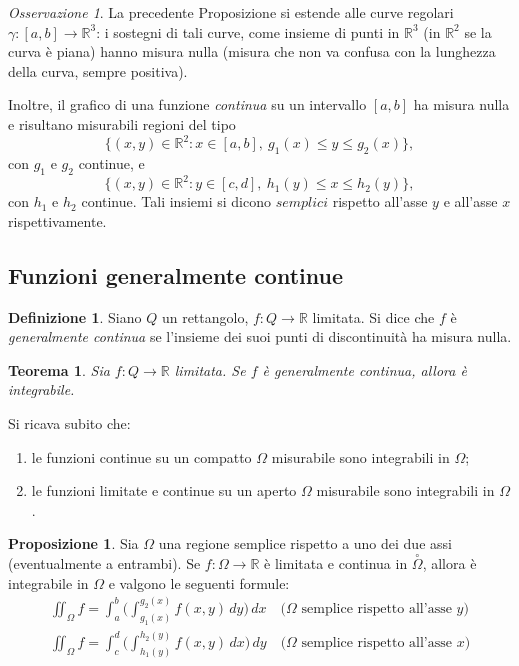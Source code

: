 \documentclass[a4paper]{book}
\numberwithin{equation}{section}
\theoremstyle{plain}
\newtheorem{teor}{Teorema}[section]
\theoremstyle{definition}
\newtheorem{defn}{Definizione}[section]
\newtheorem{prop}{Proposizione}[section]
\theoremstyle{remark}
\newtheorem{oss}{Osservazione}[section]
\theoremstyle{example}
\begin{document}
\begin{oss}
	La precedente Proposizione si estende alle curve regolari $\gamma \colon [a, b] \to \mathbb{R}^3$: i sostegni di tali curve, come insieme di punti in $\mathbb{R}^3$ (in $\mathbb{R}^2$ se la curva è piana) hanno misura nulla (misura che non va confusa con la lunghezza della curva, sempre positiva).
\end{oss}

Inoltre, il grafico di una funzione \emph{continua} su un intervallo $[a, b]$ ha misura nulla e risultano misurabili regioni del tipo
\begin{equation}
	\{(x,y) \in \mathbb{R}^2  \colon x \in [a, b], \ g_1 (x) \le y \le g_2(x)\},
\end{equation}
con $g_1$ e $g_2$ continue, e
\begin{equation}
	\{(x,y) \in \mathbb{R}^2 \colon y \in [c,d], \ h_1(y) \le x \le h_2(y) \},
\end{equation}
con $h_1$ e $h_2$ continue. Tali insiemi si dicono $semplici$ rispetto all'asse $y$ e all'asse $x$ rispettivamente.

\subsection{Funzioni generalmente continue}
\begin{defn}
	Siano $Q$ un rettangolo, $f \colon Q \to \mathbb{R}$ limitata. Si dice che $f$ è \emph{generalmente continua} se l'insieme dei suoi punti di discontinuità ha misura nulla.
\end{defn}

\begin{teor}
	Sia $f \colon Q \to \mathbb{R}$ limitata. Se $f$ è generalmente continua, allora è integrabile.
\end{teor}

Si ricava subito che:
\begin{enumerate}
	\item le funzioni continue su un compatto $\Omega$ misurabile sono integrabili in $\Omega$;
	\item le funzioni limitate e continue su un aperto $\Omega$ misurabile sono integrabili in $\Omega$.
\end{enumerate}

\begin{prop}
	Sia $\Omega$ una regione semplice rispetto a uno dei due assi (eventualmente a entrambi). Se $f \colon \Omega \to \mathbb{R}$ è limitata e continua in $\overset{\circ}{\Omega}$, allora è integrabile in $\Omega$ e valgono le seguenti formule:
	\begin{align}
		\iint_{\Omega} f = \int_a^b \biggl( \int_{g_1(x)}^{g_2(x)} f(x, y) \, dy \biggr) \, dx \quad \text{($\Omega$ semplice rispetto all'asse $y$)} \\
		\iint_{\Omega} f = \int_c^d \biggl(\int_{h_1(y)}^{h_2(y)} f(x,y) \, dx \biggr) \, dy \quad \text{($\Omega$ semplice rispetto all'asse $x$)}
	\end{align}
\end{prop}
\end{document}

